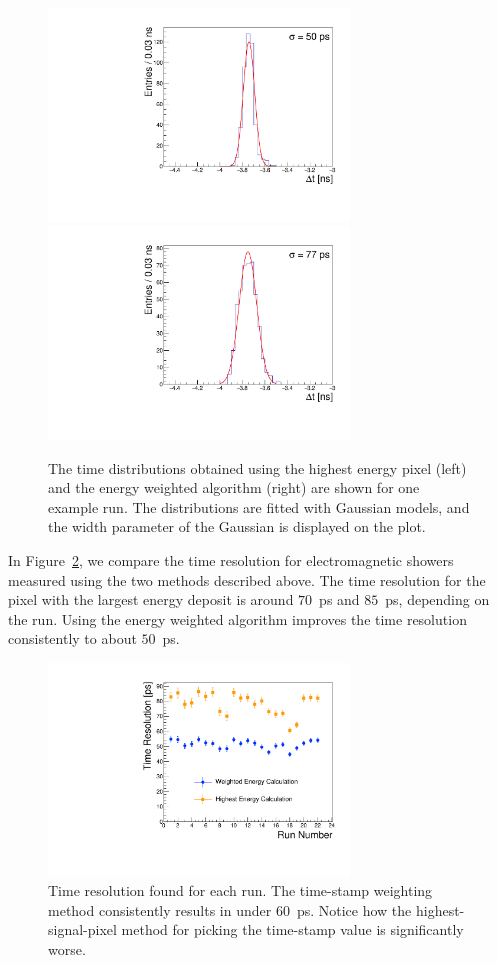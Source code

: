 \documentclass[12pt]{article}
\begin{document}
{\begin{figure}[htbp]
	\centering
	\includegraphics[width=8cm]{Images/exdt/exdtWI.pdf}
	\includegraphics[width=8cm]{Images/exdt/exdtHI.pdf}
	\caption{\small The time distributions obtained using the highest energy pixel
(left) and the energy weighted algorithm (right) are shown for one example run.
The distributions are fitted with Gaussian models, and the width parameter of
the Gaussian is displayed on the plot.}
	\label{fig:exdt}
\end{figure}


In Figure~\ref{fig:wtres}, we compare the time resolution for electromagnetic
showers measured using the two methods described above. The time resolution for
the pixel with the largest energy deposit is around $70$~ps and $85$~ps,
depending on the run. Using the energy weighted algorithm improves the time
resolution consistently to about $50$~ps. 

\begin{figure}[htbp]
	\centering
	\includegraphics[width=8cm]{Images/wtres/tresperrun.pdf}
	\caption{\small Time resolution found for each run. The time-stamp weighting
method consistently results in under $60$~ps. Notice how the
highest-signal-pixel method for picking the time-stamp value is significantly
worse.}
	\label{fig:wtres}
\end{figure}


}
\end{document}
